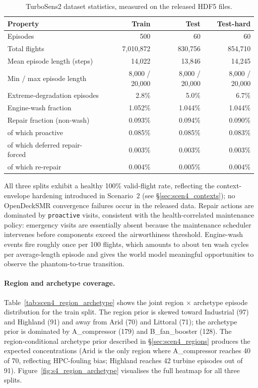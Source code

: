 \begin{table}[h]
\centering
\caption{TurboSens2 dataset statistics, measured on the released HDF5 files.}
\label{tab:scen4_summary}
\small
\begin{tabular}{lrrr}
\toprule
Property & Train & Test & Test-hard \\
\midrule
Episodes                           & 500       & 60      & 60 \\
Total flights                      & 7{,}010{,}872 & 830{,}756 & 854{,}710 \\
Mean episode length (steps)        & 14{,}022  & 13{,}846 & 14{,}245 \\
Min / max episode length           & 8{,}000 / 20{,}000 & 8{,}000 / 20{,}000 & 8{,}000 / 20{,}000 \\
Extreme-degradation episodes       & 2.8\%     & 5.0\%    & 6.7\% \\
Engine-wash fraction               & 1.052\%   & 1.044\%  & 1.044\% \\
Repair fraction (non-wash)         & 0.093\%   & 0.094\%  & 0.090\% \\
\quad of which proactive           & 0.085\%   & 0.085\%  & 0.083\% \\
\quad of which deferred repair-forced      & 0.003\%   & 0.003\%  & 0.003\% \\
\quad of which re-repair           & 0.004\%   & 0.005\%  & 0.004\% \\
\bottomrule
\end{tabular}
\end{table}

All three splits exhibit a healthy 100\% valid-flight rate, reflecting
the context-envelope hardening introduced in Scenario~2 (see
\S\ref{sec:scen4_contexts}); no OpenDeckSMR convergence failures occur
in the released data. Repair actions are dominated by \texttt{proactive}
visits, consistent with the health-correlated maintenance policy:
emergency visits are essentially absent because the maintenance scheduler
intervenes before components exceed the airworthiness threshold.
Engine-wash events fire roughly once per 100 flights, which amounts to
about ten wash cycles per average-length episode and gives the world
model meaningful opportunities to observe the phantom-to-true transition.

\paragraph{Region and archetype coverage.}
Table~\ref{tab:scen4_region_archetype} shows the joint region $\times$
archetype episode distribution for the train split. The region prior
is skewed toward Industrial (97) and Highland (91) and away from Arid
(70) and Littoral (71); the archetype prior is dominated by
A\_compressor (179) and B\_fan\_booster (128). The region-conditional
archetype prior described in \S\ref{sec:scen4_regions} produces the
expected concentrations (Arid is the only region where A\_compressor
reaches 40 of 70, reflecting HPC-fouling bias; Highland reaches 42
turbine episodes out of 91). Figure~\ref{fig:s4_region_archetype}
visualises the full heatmap for all three splits.

